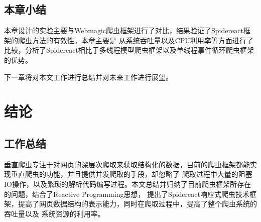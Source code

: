\documentclass[master]{njuthesis}
\begin{document}
\section{本章小结}
本章设计的实验主要与Webmagic爬虫框架进行了对比，结果验证了Spidereact框架的爬虫方法的有效性。本章主要是
从系统吞吐量以及CPU利用率等方面进行了比较，分析了Spidereact相比于多线程模型爬虫框架以及单线程事件循环爬虫框架的优势。

下一章将对本文工作进行总结并对未来工作进行展望。













\chapter{结论}
\section{工作总结}
垂直爬虫专注于对网页的深层次爬取来获取结构化的数据，目前的爬虫框架都能实现垂直爬虫的功能，并且提供并发爬取的手段，却忽略了
爬取过程中大量的阻塞IO操作，以及繁琐的解析代码编写过程。本文总结并归纳了目前爬虫框架所存在的问题，结合了Reactive Programming思想，
提出了Spidereact响应式爬虫技术框架，提高了网页数据结构的表示能力，同时在爬取过程中，提高了整个爬虫系统的吞吐量以及
系统资源的利用率。
\end{document}
